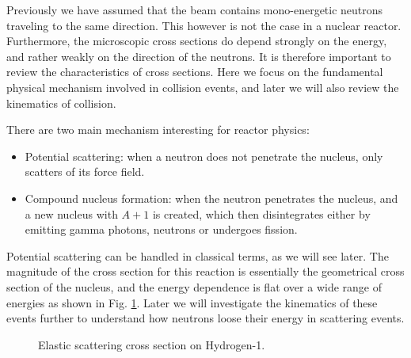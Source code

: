 Previously we have assumed that the beam contains mono-energetic neutrons traveling to the same direction. This however is not the case in a nuclear reactor. Furthermore, the microscopic cross sections do depend strongly on the energy, and rather weakly on the direction of the neutrons. It is therefore important to review the characteristics of cross sections. Here we focus on the fundamental physical mechanism involved in collision events, and later we will also review the kinematics of collision.

There are two main mechanism interesting for reactor physics:

\begin{itemize}
\item Potential scattering: when a neutron does not penetrate the nucleus, only scatters of its force field.
\item Compound nucleus formation: when the neutron penetrates the nucleus, and a new nucleus with $A+1$ is created, which then disintegrates either by emitting gamma photons, neutrons or undergoes fission.
\end{itemize}

Potential scattering can be handled in classical terms, as we will see later. The magnitude of the cross section for this reaction is essentially the geometrical cross section of the nucleus, and the energy dependence is flat over a wide range of energies as shown in Fig. \ref{fig:h1scatter}. Later we will investigate the kinematics of these events further to understand how neutrons loose their energy in scattering events.

\begin{figure}[ht!]
\protect {}\protect
\caption{\label{fig:h1scatter} \footnotesize{Elastic scattering cross section on Hydrogen-1.}}
\end{figure}

